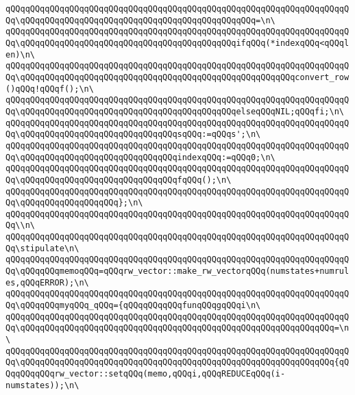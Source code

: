 \verb|qQQqqQQqqQQqqQQqqQQqqQQqqQQqqQQqqQQqqQQqqQQqqQQqqQQqqQQqqQQqqQQqqQQqqQQq\qQQqqQQqqQQqqQQqqQQqqQQqqQQqqQQqqQQqqQQqqQQqqQQq=\n\|\newline
\verb|qQQqqQQqqQQqqQQqqQQqqQQqqQQqqQQqqQQqqQQqqQQqqQQqqQQqqQQqqQQqqQQqqQQqqQQq\qQQqqQQqqQQqqQQqqQQqqQQqqQQqqQQqqQQqqQQqqQQqifqQQq(*indexqQQq<qQQqlen)\n\|\newline
\verb|qQQqqQQqqQQqqQQqqQQqqQQqqQQqqQQqqQQqqQQqqQQqqQQqqQQqqQQqqQQqqQQqqQQqqQQq\qQQqqQQqqQQqqQQqqQQqqQQqqQQqqQQqqQQqqQQqqQQqqQQqqQQqqQQqconvert_row()qQQq!qQQqf();\n\|\newline
\verb|qQQqqQQqqQQqqQQqqQQqqQQqqQQqqQQqqQQqqQQqqQQqqQQqqQQqqQQqqQQqqQQqqQQqqQQq\qQQqqQQqqQQqqQQqqQQqqQQqqQQqqQQqqQQqqQQqqQQqelseqQQqNIL;qQQqfi;\n\|\newline
\verb|qQQqqQQqqQQqqQQqqQQqqQQqqQQqqQQqqQQqqQQqqQQqqQQqqQQqqQQqqQQqqQQqqQQqqQQq\qQQqqQQqqQQqqQQqqQQqqQQqqQQqqQQqsqQQq:=qQQqs';\n\|\newline
\verb|qQQqqQQqqQQqqQQqqQQqqQQqqQQqqQQqqQQqqQQqqQQqqQQqqQQqqQQqqQQqqQQqqQQqqQQq\qQQqqQQqqQQqqQQqqQQqqQQqqQQqqQQqindexqQQq:=qQQq0;\n\|\newline
\verb|qQQqqQQqqQQqqQQqqQQqqQQqqQQqqQQqqQQqqQQqqQQqqQQqqQQqqQQqqQQqqQQqqQQqqQQq\qQQqqQQqqQQqqQQqqQQqqQQqqQQqqQQqfqQQq();\n\|\newline
\verb|qQQqqQQqqQQqqQQqqQQqqQQqqQQqqQQqqQQqqQQqqQQqqQQqqQQqqQQqqQQqqQQqqQQqqQQq\qQQqqQQqqQQqqQQqqQQq};\n\|\newline
\verb|qQQqqQQqqQQqqQQqqQQqqQQqqQQqqQQqqQQqqQQqqQQqqQQqqQQqqQQqqQQqqQQqqQQqqQQq\\n\|\newline
\verb|qQQqqQQqqQQqqQQqqQQqqQQqqQQqqQQqqQQqqQQqqQQqqQQqqQQqqQQqqQQqqQQqqQQqqQQq\stipulate\n\|\newline
\verb|qQQqqQQqqQQqqQQqqQQqqQQqqQQqqQQqqQQqqQQqqQQqqQQqqQQqqQQqqQQqqQQqqQQqqQQq\qQQqqQQqmemoqQQq=qQQqrw_vector::make_rw_vectorqQQq(numstates+numrules,qQQqERROR);\n\|\newline
\verb|qQQqqQQqqQQqqQQqqQQqqQQqqQQqqQQqqQQqqQQqqQQqqQQqqQQqqQQqqQQqqQQqqQQqqQQq\qQQqqQQqmyqQQq_qQQq={qQQqqQQqqQQqfunqQQqgqQQqi\n\|\newline
\verb|qQQqqQQqqQQqqQQqqQQqqQQqqQQqqQQqqQQqqQQqqQQqqQQqqQQqqQQqqQQqqQQqqQQqqQQq\qQQqqQQqqQQqqQQqqQQqqQQqqQQqqQQqqQQqqQQqqQQqqQQqqQQqqQQqqQQqqQQq=\n\|\newline
\verb|qQQqqQQqqQQqqQQqqQQqqQQqqQQqqQQqqQQqqQQqqQQqqQQqqQQqqQQqqQQqqQQqqQQqqQQq\qQQqqQQqqQQqqQQqqQQqqQQqqQQqqQQqqQQqqQQqqQQqqQQqqQQqqQQqqQQqqQQq{qQQqqQQqqQQqrw_vector::setqQQq(memo,qQQqi,qQQqREDUCEqQQq(i-numstates));\n\|\newline
